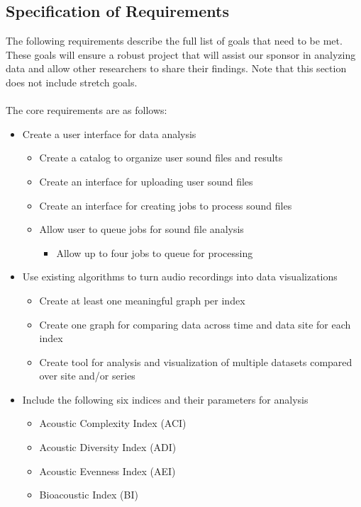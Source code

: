 \subsection{Specification of Requirements}
The following requirements describe the full list of goals that need to be met. These goals will ensure a robust project that will assist our sponsor in analyzing data and allow other researchers to share their findings. Note that this section does not include stretch goals.\\\\
The core requirements are as follows:
\begin{itemize}
  \item Create a user interface for data analysis
  \begin{itemize}
    \item Create a catalog to organize user sound files and results
    \item Create an interface for uploading user sound files
    \item Create an interface for creating jobs to process sound files
    \item Allow user to queue jobs for sound file analysis
    \begin{itemize}
      \item Allow up to four jobs to queue for processing
    \end{itemize}
  \end{itemize}
  \item Use existing algorithms to turn audio recordings into data visualizations
    \begin{itemize}
      \item Create at least one meaningful graph per index
      \item Create one graph for comparing data across time and data site for each index
      \item Create tool for analysis and visualization of multiple datasets compared over site and/or series
    \end{itemize}
  \item Include the following six indices and their parameters for analysis
    \begin{itemize}
      \item Acoustic Complexity Index (ACI)
      \item Acoustic Diversity Index (ADI)
      \item Acoustic Evenness Index (AEI)
      \item Bioacoustic Index (BI)

\end{itemize}
\end{itemize}
